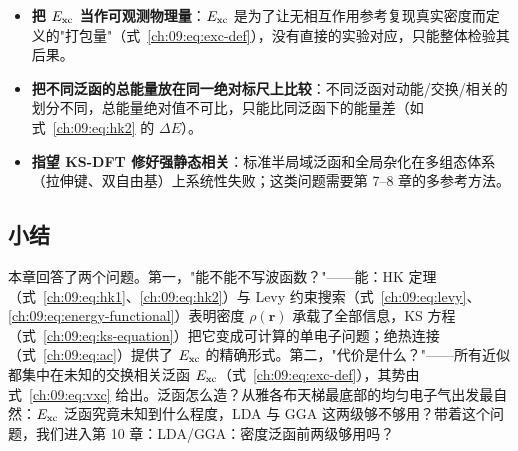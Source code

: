 \begin{pitfall}
\begin{itemize}
  \item \textbf{把 $E_{\mathrm{xc}}$ 当作可观测物理量}：$E_{\mathrm{xc}}$ 是为了让无相互作用参考复现真实密度而定义的"打包量"（式~\eqref{ch:09:eq:exc-def}），没有直接的实验对应，只能整体检验其后果。
  \item \textbf{把不同泛函的总能量放在同一绝对标尺上比较}：不同泛函对动能/交换/相关的划分不同，总能量绝对值不可比，只能比同泛函下的能量差（如式~\eqref{ch:09:eq:hk2} 的 $\Delta E$）。
  \item \textbf{指望 KS-DFT 修好强静态相关}：标准半局域泛函和全局杂化在多组态体系（拉伸键、双自由基）上系统性失败；这类问题需要第 7--8 章的多参考方法。
\end{itemize}
\end{pitfall}

\subsection*{小结}
本章回答了两个问题。第一，"能不能不写波函数？"——能：HK 定理（式~\eqref{ch:09:eq:hk1}、\eqref{ch:09:eq:hk2}）与 Levy 约束搜索（式~\eqref{ch:09:eq:levy}、\eqref{ch:09:eq:energy-functional}）表明密度 $\rho(\mathbf{r})$ 承载了全部信息，KS 方程（式~\eqref{ch:09:eq:ks-equation}）把它变成可计算的单电子问题；绝热连接（式~\eqref{ch:09:eq:ac}）提供了 $E_{\mathrm{xc}}$ 的精确形式。第二，"代价是什么？"——所有近似都集中在未知的交换相关泛函 $E_{\mathrm{xc}}$（式~\eqref{ch:09:eq:exc-def}），其势由式~\eqref{ch:09:eq:vxc} 给出。泛函怎么造？从雅各布天梯最底部的均匀电子气出发最自然：$E_{\mathrm{xc}}$ 泛函究竟未知到什么程度，LDA 与 GGA 这两级够不够用？带着这个问题，我们进入第 10 章：LDA/GGA：密度泛函前两级够用吗？
